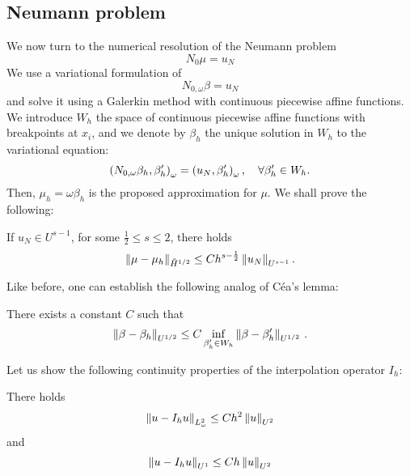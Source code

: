 \documentclass[a4paper]{article}
\begin{document}
\subsection{Neumann problem}

We now turn to the numerical resolution of the Neumann problem
\[N_0 \mu = u_N\] 
We use a variational formulation of  
\[N_{0,\omega} \beta = u_N\]
and solve it using a Galerkin method with continuous piecewise affine functions. We introduce $W_h$ the space of continuous piecewise affine functions with breakpoints at $x_i$, and we denote by $\beta_h$ the unique solution in $W_h$ to the variational equation:
\begin{equation}
\left( N_{0,\omega} \beta_h,\beta_h'\right)_{\omega} = \left( u_N,\beta_h'\right)_{\omega}, \quad \forall \beta_h' \in W_h.
\label{NomegaBetaGalerk}
\end{equation}
Then, $\mu_h = \omega \beta_h$ is the proposed approximation for $\mu$. 
We shall prove the following:
\begin{The}
	If $u_N \in U^{s-1}$, for some $\frac{1}{2} \leq s \leq 2$, there holds 
	\[\left\|\mu - \mu_h\right\|_{\tilde{H}^{1/2}} \leq C h^{s - \frac{1}{2}}\left\|u_N\right\|_{U^{s-1}}.\]
	\label{theOrdreCVNeumann}
\end{The}
\noindent Like before, one can establish the following analog of Céa's lemma:
\begin{Lem}
	There exists a constant $C$ such that
	\[\left\|\beta - \beta_h\right\|_{U^{1/2}} \leq C \inf_{\beta'_h \in W_h} \left\|\beta - \beta'_h\right\|_{U^{1/2}}\,.\] 
	\label{CeaNeumann}
\end{Lem}
\noindent Let us show the following continuity properties of the interpolation operator $I_h$: 
\begin{Lem} 
	\label{U0U2,U1U2}
	There holds 
	\[ \left\| u - I_h u\right\|_{L^2_\omega} \leq Ch^2\left\|u\right\|_{U^2}\]
	and
	\[\left\|u-I_h u\right\|_{U^1} \leq Ch \left\|u\right\|_{U^2}\]	
\end{Lem}
\end{document}
